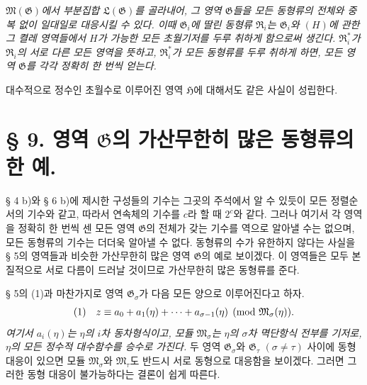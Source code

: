 \emph{$\mathfrak M(\mathfrak G)$에서 부분집합 $\mathfrak L(\mathfrak G)$를 골라내어, 그 영역 $\mathfrak G$들을 모든 동형류의 전체와 중복 없이 일대일로 대응시킬 수 있다. 이때 $\mathfrak G_i$에 딸린 동형류 $\mathfrak R_i$는 $\mathfrak G_i$와 $(H)$에 관한 그 켤레 영역들에서 $H$가 가능한 모든 초월기저를 두루 취하게 함으로써 생긴다. $\mathfrak R_i^*$가 $\mathfrak R_i$의 서로 다른 모든 영역을 뜻하고, $\mathfrak R_i^*$가 모든 동형류를 두루 취하게 하면, 모든 영역 $\mathfrak G$를 각각 정확히 한 번씩 얻는다.}

대수적으로 정수인 초월수로 이루어진 영역 $\mathfrak H$에 대해서도 같은 사실이 성립한다.

\section*{§ 9. 영역 $\mathfrak G$의 가산무한히 많은 동형류의 한 예.}

§ 4 b)와 § 6 b)에 제시한 구성들의 기수는 그곳의 주석에서 알 수 있듯이 모든 정렬순서의 기수와 같고, 따라서 연속체의 기수를 $c$라 할 때 $2^c$와 같다. 그러나 여기서 각 영역을 정확히 한 번씩 센 모든 영역 $\mathfrak G$의 전체가 갖는 기수를 역으로 알아낼 수는 없으며, 모든 동형류의 기수는 더더욱 알아낼 수 없다. 동형류의 수가 유한하지 않다는 사실을 § 5의 영역들과 비슷한 가산무한히 많은 영역 $\mathfrak G$의 예로 보이겠다. 이 영역들은 모두 본질적으로 서로 다름이 드러날 것이므로 가산무한히 많은 동형류를 준다.

§ 5의 (1)과 마찬가지로 영역 $\mathfrak G_\sigma$가 다음 모든 양으로 이루어진다고 하자.
\[
\begin{array}{@{}l@{\quad}l@{}}
(1)& \displaystyle z\equiv a_0+a_1(\eta)+\cdots+a_{\sigma-1}(\eta)
 \pmod{\mathfrak M_\sigma(\eta)}.
\end{array}
\]
\emph{여기서 $a_i(\eta)$는 $\eta$의 $i$차 동차형식이고, 모듈 $\mathfrak M_\sigma$는 $\eta$의 $\sigma$차 멱단항식 전부를 기저로, $\eta$의 모든 정수적 대수함수를 승수로 가진다.} 두 영역 $\mathfrak G_\sigma$와 $\mathfrak G_\tau$ $(\sigma\ne\tau)$ 사이에 동형 대응이 있으면 모듈 $\mathfrak M_\sigma$와 $\mathfrak M_\tau$도 반드시 서로 동형으로 대응함을 보이겠다. 그러면 그러한 동형 대응이 불가능하다는 결론이 쉽게 따른다.

